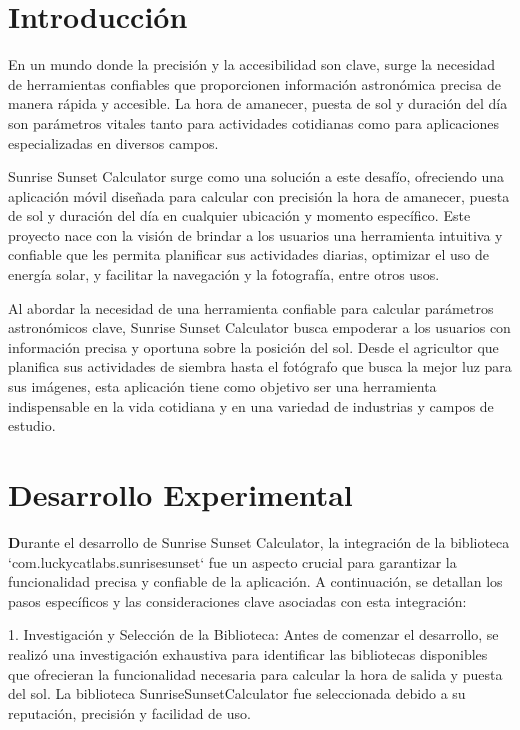 \documentclass[conference]{IEEEtran}
\begin{document}




\section{Introducción}

En un mundo donde la precisión y la accesibilidad son clave, surge la necesidad de herramientas confiables que proporcionen información astronómica precisa de manera rápida y accesible. La hora de amanecer, puesta de sol y duración del día son parámetros vitales tanto para actividades cotidianas como para aplicaciones especializadas en diversos campos.

Sunrise Sunset Calculator surge como una solución a este desafío, ofreciendo una aplicación móvil diseñada para calcular con precisión la hora de amanecer, puesta de sol y duración del día en cualquier ubicación y momento específico. Este proyecto nace con la visión de brindar a los usuarios una herramienta intuitiva y confiable que les permita planificar sus actividades diarias, optimizar el uso de energía solar, y facilitar la navegación y la fotografía, entre otros usos.

Al abordar la necesidad de una herramienta confiable para calcular parámetros astronómicos clave, Sunrise Sunset Calculator busca empoderar a los usuarios con información precisa y oportuna sobre la posición del sol. Desde el agricultor que planifica sus actividades de siembra hasta el fotógrafo que busca la mejor luz para sus imágenes, esta aplicación tiene como objetivo ser una herramienta indispensable en la vida cotidiana y en una variedad de industrias y campos de estudio.
 
\section{Desarrollo Experimental}

\textbf
Durante el desarrollo de Sunrise Sunset Calculator, la integración de la biblioteca `com.luckycatlabs.sunrisesunset` fue un aspecto crucial para garantizar la funcionalidad precisa y confiable de la aplicación. A continuación, se detallan los pasos específicos y las consideraciones clave asociadas con esta integración:

1. Investigación y Selección de la Biblioteca: Antes de comenzar el desarrollo, se realizó una investigación exhaustiva para identificar las bibliotecas disponibles que ofrecieran la funcionalidad necesaria para calcular la hora de salida y puesta del sol. La biblioteca SunriseSunsetCalculator fue seleccionada debido a su reputación, precisión y facilidad de uso.
\end{document}
